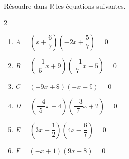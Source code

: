 {%
\begin{Exercice}%
Résoudre dans $\mathbb R$ les équations suivantes.
\begin{multicols}{2}
\begin{enumerate}[itemsep=1em,label={}]
	\item \begin{minipage}[t]{\linewidth}$A = \left( x+\dfrac{6}{7} \right)  \left( -2x+\dfrac{5}{7} \right) =0$\,\,\,\,\end{minipage}
	\item \begin{minipage}[t]{\linewidth}$B = \left( \dfrac{-1}{5}x+9  \right) \left( \dfrac{-1}{7}x+5 \right) =0$\,\,\,\,\end{minipage}
	\item \begin{minipage}[t]{\linewidth}$C = \left( -9x+8 \right)  \left( -x+9 \right) =0$\,\,\,\,\end{minipage}
	\item \begin{minipage}[t]{\linewidth}$D = \left( \dfrac{-4}{5}x+4 \right)  \left( \dfrac{-3}{7}x+2 \right) =0$\,\,\,\,\end{minipage}
	\item \begin{minipage}[t]{\linewidth}$E = \left( 3x-\dfrac{1}{2} \right)  \left( 4x-\dfrac{6}{7} \right) =0$\,\,\,\,\end{minipage}
	\item \begin{minipage}[t]{\linewidth}$F = \left( -x+1 \right)  \left( 9x+8 \right) =0$\,\,\,\,\end{minipage}
\end{enumerate}
\end{multicols}
\end{Exercice}

}
